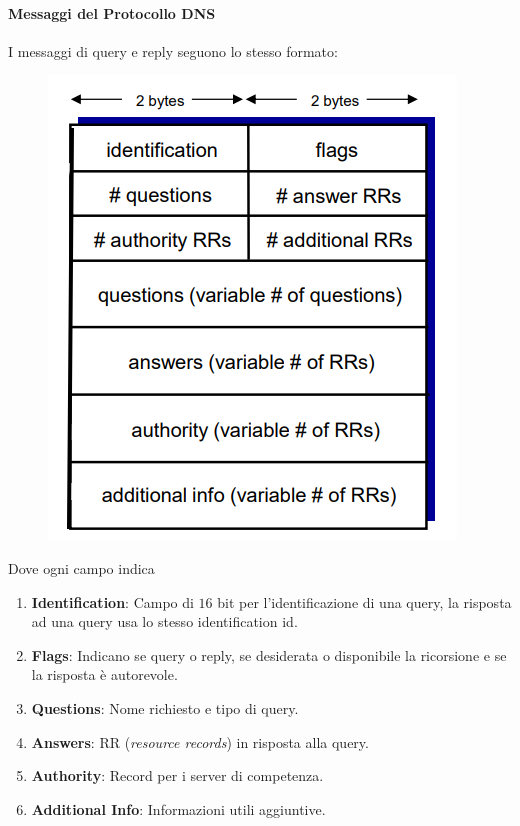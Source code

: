 \documentclass{article}
\begin{document}
\newpage

\paragraph{Messaggi del Protocollo DNS} I messaggi di query e reply seguono lo stesso formato:

\begin{figure}[htbp]
    \center
    \includegraphics[scale=0.65]{img/messaggioDNS.png}
\end{figure}

Dove ogni campo indica

\begin{enumerate}
    \item \textbf{Identification}: Campo di $16$ bit per l'identificazione di una query, la risposta ad una query usa lo stesso identification id.
    \item \textbf{Flags}: Indicano se query o reply, se desiderata o disponibile la ricorsione e se la risposta è autorevole.
    \item \textbf{Questions}: Nome richiesto e tipo di query.
    \item \textbf{Answers}: RR (\textit{resource records}) in risposta alla query.
    \item \textbf{Authority}: Record per i server di competenza.
    \item \textbf{Additional Info}: Informazioni utili aggiuntive.
\end{enumerate}
\end{document}
